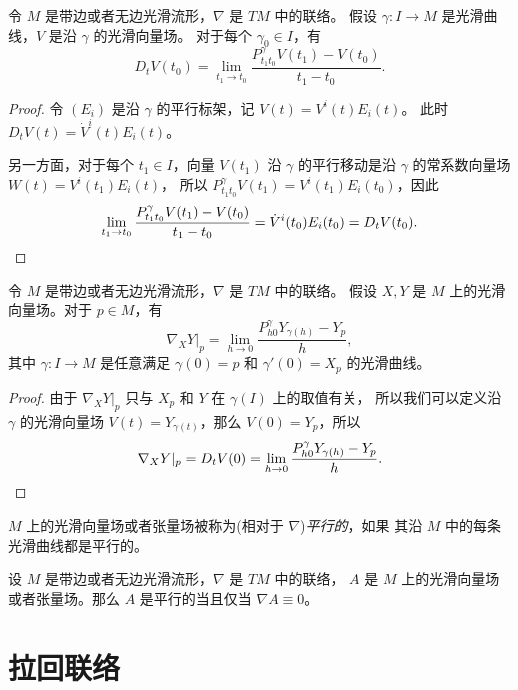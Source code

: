 \begin{theorem}[平行移动确定协变导数]
  令 $M$ 是带边或者无边光滑流形，$\nabla$ 是 $TM$ 中的联络。
  假设 $\gamma:I\to M$ 是光滑曲线，$V$ 是沿 $\gamma$ 的光滑向量场。
  对于每个 $\gamma_0\in I$，有
  \begin{equation}
    D_tV(t_0)=\lim_{t_1\to t_0}\frac{P_{t_1t_0}^\gamma V(t_1)-V(t_0)}{t_1-t_0}.
  \end{equation}
\end{theorem}
\begin{proof}
  令 $(E_i)$ 是沿 $\gamma$ 的平行标架，记 $V(t)=V^i(t)E_i(t)$。
  此时 $D_tV(t)=\dot V^i(t)E_i(t)$。

  另一方面，对于每个 $t_1\in I$，向量 $V(t_1)$ 沿 $\gamma$
  的平行移动是沿 $\gamma$ 的常系数向量场 $W(t)=V^i(t_1)E_i(t)$，
  所以 $P_{t_1t_0}^\gamma V(t_1)=V^i(t_1)E_i(t_0)$，因此
  \[
    \lim_{t_1\to t_0}\frac{P_{t_1t_0}^\gamma V(t_1)-V(t_0)}{t_1-t_0}=
    \dot V^i(t_0)E_i(t_0)=D_tV(t_0).\qedhere
  \]
\end{proof}

\begin{corollary}[平行移动确定联络]
  令 $M$ 是带边或者无边光滑流形，$\nabla$ 是 $TM$ 中的联络。
  假设 $X,Y$ 是 $M$ 上的光滑向量场。对于 $p\in M$，有
  \begin{equation}
    \nabla_XY|_p=\lim_{h\to 0}\frac{P_{h0}^\gamma Y_{\gamma(h)}-Y_{p}}{h},
  \end{equation}
  其中 $\gamma:I\to M$ 是任意满足 $\gamma(0)=p$ 和 $\gamma'(0)=X_p$ 的光滑曲线。
\end{corollary}
\begin{proof}
  由于 $\nabla_XY|_p$ 只与 $X_p$ 和 $Y$ 在 $\gamma(I)$ 上的取值有关，
  所以我们可以定义沿 $\gamma$ 的光滑向量场 $V(t)=Y_{\gamma(t)}$，那么 $V(0)=Y_p$，所以
  \[
    \nabla_XY|_p=D_tV(0)=\lim_{h\to 0}\frac{P_{h0}^\gamma Y_{\gamma(h)}-Y_p}{h}.\qedhere
  \]
\end{proof}

$M$ 上的光滑向量场或者张量场被称为(相对于 $\nabla$)\emph{平行的}，如果
其沿 $M$ 中的每条光滑曲线都是平行的。

\begin{proposition}
  设 $M$ 是带边或者无边光滑流形，$\nabla$ 是 $TM$ 中的联络，
  $A$ 是 $M$ 上的光滑向量场或者张量场。那么 $A$ 是平行的当且仅当 $\nabla A\equiv 0$。
\end{proposition}

\section{拉回联络}







